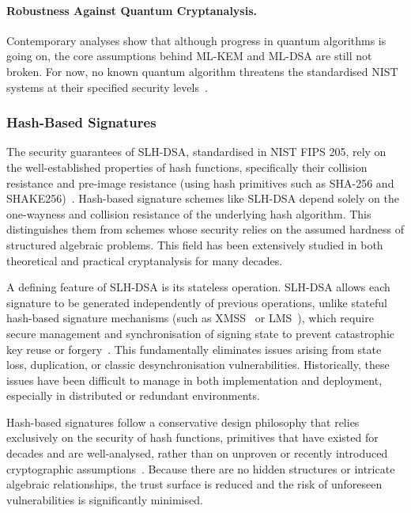 \documentclass[12pt,a4paper]{article}
\begin{document}
\paragraph*{Robustness Against Quantum Cryptanalysis.}
Contemporary analyses show that although progress in quantum algorithms is going on, the core assumptions behind ML-KEM and ML-DSA are still not broken. For now, no known quantum algorithm threatens the standardised NIST systems at their specified security levels~\cite{nist-fips-203-2024,nist-fips-204-2024}.

\subsubsection{Hash-Based Signatures}

The security guarantees of SLH-DSA, standardised in NIST FIPS 205, rely on the well-established properties of hash functions, specifically their collision resistance and pre-image resistance (using hash primitives such as SHA-256 and SHAKE256)~\cite{nist-fips-205-2024}. Hash-based signature schemes like SLH-DSA depend solely on the one-wayness and collision resistance of the underlying hash algorithm. This distinguishes them from schemes whose security relies on the assumed hardness of structured algebraic problems. This field has been extensively studied in both theoretical and practical cryptanalysis for many decades.

A defining feature of SLH-DSA is its stateless operation. SLH-DSA allows each signature to be generated independently of previous operations, unlike stateful hash-based signature mechanisms (such as XMSS~\cite{rfc8391-xmss} or LMS~\cite{rfc8554-lms}), which require secure management and synchronisation of signing state to prevent catastrophic key reuse or forgery~\cite{nist-sp800-208-2020}. This fundamentally eliminates issues arising from state loss, duplication, or classic desynchronisation vulnerabilities. Historically, these issues have been difficult to manage in both implementation and deployment, especially in distributed or redundant environments.

Hash-based signatures follow a conservative design philosophy that relies exclusively on the security of hash functions, primitives that have existed for decades and are well-analysed, rather than on unproven or recently introduced cryptographic assumptions~\cite{nist-fips-205-2024}. Because there are no hidden structures or intricate algebraic relationships, the trust surface is reduced and the risk of unforeseen vulnerabilities is significantly minimised.
\end{document}
